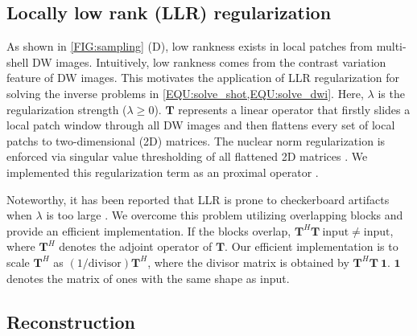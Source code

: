 \documentclass[preprint,12pt,authoryear,review]{elsarticle}
\begin{document}
	\subsection{Locally low rank (LLR) regularization}

	As shown in \cref{FIG:sampling} (D), low rankness exists
	in local patches from multi-shell DW images.
        Intuitively, low rankness comes from the contrast variation feature of DW images.
        This motivates the application of LLR regularization \citep{trzasko_2011_lr,zhang_2015_llr}
	for solving the inverse problems in \cref{EQU:solve_shot,EQU:solve_dwi}.
	Here, $\lambda$ is the regularization strength ($\lambda \geq 0$).
	$\mathbf{T}$ represents a linear operator that firstly slides a local patch window
	through all DW images and then
	flattens every set of local patchs to two-dimensional (2D) matrices.
	The nuclear norm regularization is enforced via
        singular value thresholding of all flattened 2D matrices \citep{cai_2010_svt}.
	We implemented this regularization term as an proximal operator \citep{beck_2017_optim}.

	Noteworthy, it has been reported that LLR is prone to checkerboard artifacts
	when $\lambda$ is too large \citep{hu_2020_spa_llr}.
	We overcome this problem utilizing overlapping blocks and provide an efficient implementation.
	If the blocks overlap, $\mathbf{T}^H \mathbf{T}~\mathrm{input} \neq \mathrm{input}$,
	where $\mathbf{T}^H$ denotes the adjoint operator of $\mathbf{T}$.
	Our efficient implementation is to scale $\mathbf{T}^H$
	as $(1 / \mathrm{divisor})\mathbf{T}^H$,
	where the divisor matrix is obtained by $\mathbf{T}^H \mathbf{T}~\mathbf{1}$.
	$\mathbf{1}$ denotes the matrix of ones with the same shape as input.

	\subsection{Reconstruction}
\end{document}
